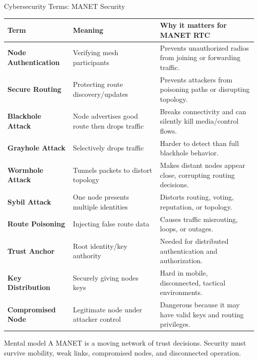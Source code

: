 \documentclass[aspectratio=169]{beamer}
\begin{document}
\begin{frame}{Cybersecurity Terms: MANET Security}
\tiny
\begin{tabular}{p{2.2cm} p{3.5cm} p{6.5cm}}
\toprule
\textbf{Term} & \textbf{Meaning} & \textbf{Why it matters for MANET RTC} \\
\midrule
\textbf{Node Authentication} & Verifying mesh participants & Prevents unauthorized radios from joining or forwarding traffic. \\
\textbf{Secure Routing} & Protecting route discovery/updates & Prevents attackers from poisoning paths or disrupting topology. \\
\textbf{Blackhole Attack} & Node advertises good route then drops traffic & Breaks connectivity and can silently kill media/control flows. \\
\textbf{Grayhole Attack} & Selectively drops traffic & Harder to detect than full blackhole behavior. \\
\textbf{Wormhole Attack} & Tunnels packets to distort topology & Makes distant nodes appear close, corrupting routing decisions. \\
\textbf{Sybil Attack} & One node presents multiple identities & Distorts routing, voting, reputation, or topology. \\
\textbf{Route Poisoning} & Injecting false route data & Causes traffic misrouting, loops, or outages. \\
\textbf{Trust Anchor} & Root identity/key authority & Needed for distributed authentication and authorization. \\
\textbf{Key Distribution} & Securely giving nodes keys & Hard in mobile, disconnected, tactical environments. \\
\textbf{Compromised Node} & Legitimate node under attacker control & Dangerous because it may have valid keys and routing privileges. \\
\bottomrule
\end{tabular}

\vspace{0.15cm}
\begin{block}{Mental model}
A MANET is a moving network of trust decisions. Security must survive mobility, weak links, compromised nodes, and disconnected operation.
\end{block}
\end{frame}
\end{document}

